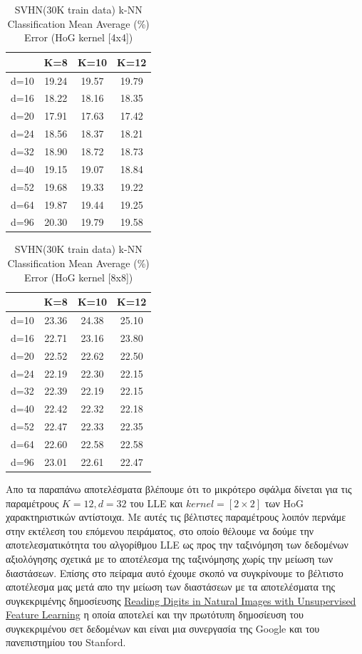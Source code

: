 \begin{table}[H]
\centering
\label{tab:table12}
\begin{tabular}{|c|c|c|c|}
\hline
 & K=8 & K=10 & K=12 \\
\hline
d=10 & 19.24 & 19.57 & 19.79 \\
d=16 & 18.22 & 18.16 & 18.35 \\
d=20 & 17.91 & 17.63 & 17.42 \\
d=24 & 18.56 & 18.37 & 18.21 \\
d=32 & 18.90 & 18.72 & 18.73 \\
d=40 & 19.15 & 19.07 & 18.84 \\
d=52 & 19.68 & 19.33 & 19.22 \\
d=64 & 19.87 & 19.44 & 19.25 \\
d=96 & 20.30 & 19.79 & 19.58 \\
\hline
\end{tabular}
\caption{SVHN(30K train data) k-NN Classification Mean Average (\%) Error (HoG kernel [4x4])}
\end{table}

\begin{table}[H]
\centering
\label{tab:table13}
\begin{tabular}{|c|c|c|c|}
\hline
 & K=8 & K=10 & K=12 \\
\hline
d=10 & 23.36 & 24.38 & 25.10 \\
d=16 & 22.71 & 23.16 & 23.80 \\
d=20 & 22.52 & 22.62 & 22.50 \\
d=24 & 22.19 & 22.30 & 22.15 \\
d=32 & 22.39 & 22.19 & 22.15 \\
d=40 & 22.42 & 22.32 & 22.18 \\
d=52 & 22.47 & 22.33 & 22.35 \\
d=64 & 22.60 & 22.58 & 22.58 \\
d=96 & 23.01 & 22.61 & 22.47 \\
\hline
\end{tabular}
\caption{SVHN(30K train data) k-NN Classification Mean Average (\%) Error (HoG kernel [8x8])}
\end{table}

\par
Απο τα παραπάνω αποτελέσματα βλέπουμε ότι το μικρότερο σφάλμα δίνεται για τις παραμέτρους $K=12, d=32$ του \textlatin{LLE} και $kernel=[2 \times 2]$ των \textlatin{HoG} χαρακτηριστικών αντίστοιχα. Με αυτές τις βέλτιστες παραμέτρους λοιπόν περνάμε στην εκτέλεση του επόμενου πειράματος, στο οποίο θέλουμε να δούμε την αποτελεσματικότητα του αλγορίθμου \textlatin{LLE} ως προς την ταξινόμηση των δεδομένων αξιολόγησης σχετικά με το αποτέλεσμα της ταξινόμησης χωρίς την μείωση των διαστάσεων. Επίσης στο πείραμα αυτό έχουμε σκοπό να συγκρίνουμε το βέλτιστο αποτέλεσμα μας μετά απο την μείωση των διαστάσεων με τα αποτελέσματα της συγκεκριμένης δημοσίευσης \href{http://ufldl.stanford.edu/housenumbers/nips2011\textunderscore housenumbers.pdf}{\textlatin{Reading Digits in Natural Images
with Unsupervised Feature Learning}} η οποία αποτελεί και την πρωτότυπη δημοσίευση του συγκεκριμένου σετ δεδομένων και είναι μια συνεργασία της \textlatin{Google} και του πανεπιστημίου του \textlatin{Stanford}.
